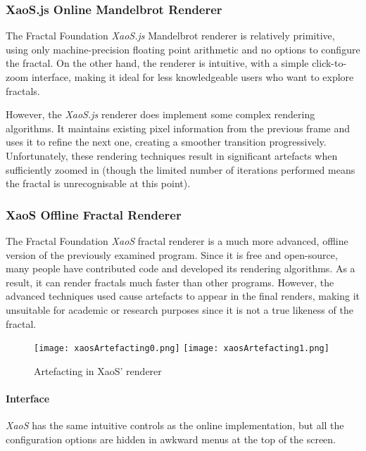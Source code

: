 \subsubsection{XaoS.js Online Mandelbrot Renderer \cite{xaos.js}}

The Fractal Foundation \textit{XaoS.js} Mandelbrot renderer is relatively primitive, using only machine-precision floating point arithmetic and no options to configure the fractal. On the other hand, the renderer is intuitive, with a simple click-to-zoom interface, making it ideal for less knowledgeable users who want to explore fractals.

However, the \textit{XaoS.js} renderer does implement some complex rendering algorithms. It maintains existing pixel information from the previous frame and uses it to refine the next one, creating a smoother transition progressively. Unfortunately, these rendering techniques result in significant artefacts when sufficiently zoomed in (though the limited number of iterations performed means the fractal is unrecognisable at this point).

\subsubsection{XaoS Offline Fractal Renderer \cite{fractalfoundation}}

The Fractal Foundation \textit{XaoS} fractal renderer is a much more advanced, offline version of the previously examined program. Since it is free and open-source, many people have contributed code and developed its rendering algorithms. As a result, it can render fractals much faster than other programs. However, the advanced techniques used cause artefacts to appear in the final renders, making it unsuitable for academic or research purposes since it is not a true likeness of the fractal.

\FloatBarrier

\begin{figure}[htp]
    \centering
    \texttt{[image: xaosArtefacting0.png]}
    \texttt{[image: xaosArtefacting1.png]}
    \caption{Artefacting in XaoS' renderer}
\end{figure}

\FloatBarrier

\paragraph{Interface} \textit{XaoS} has the same intuitive controls as the online implementation, but all the configuration options are hidden in awkward menus at the top of the screen.

